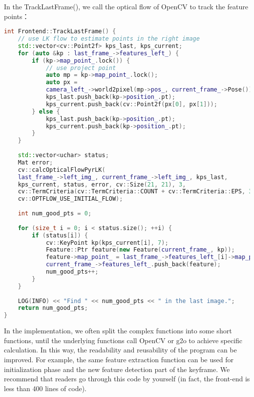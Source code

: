 In the TrackLastFrame(), we call the optical flow of OpenCV to track the feature points：
\begin{lstlisting}[language=c++,caption=slambook2/ch13/src/frontend.cpp]
int Frontend::TrackLastFrame() {
	// use LK flow to estimate points in the right image
	std::vector<cv::Point2f> kps_last, kps_current;
	for (auto &kp : last_frame_->features_left_) {
		if (kp->map_point_.lock()) {
			// use project point
			auto mp = kp->map_point_.lock();
			auto px =
			camera_left_->world2pixel(mp->pos_, current_frame_->Pose());
			kps_last.push_back(kp->position_.pt);
			kps_current.push_back(cv::Point2f(px[0], px[1]));
		} else {
			kps_last.push_back(kp->position_.pt);
			kps_current.push_back(kp->position_.pt);
		}
	}
	
	std::vector<uchar> status;
	Mat error;
	cv::calcOpticalFlowPyrLK(
	last_frame_->left_img_, current_frame_->left_img_, kps_last,
	kps_current, status, error, cv::Size(21, 21), 3,
	cv::TermCriteria(cv::TermCriteria::COUNT + cv::TermCriteria::EPS, 30, 0.01),
	cv::OPTFLOW_USE_INITIAL_FLOW);
	
	int num_good_pts = 0;
	
	for (size_t i = 0; i < status.size(); ++i) {
		if (status[i]) {
			cv::KeyPoint kp(kps_current[i], 7);
			Feature::Ptr feature(new Feature(current_frame_, kp));
			feature->map_point_ = last_frame_->features_left_[i]->map_point_;
			current_frame_->features_left_.push_back(feature);
			num_good_pts++;
		}
	}
	
	LOG(INFO) << "Find " << num_good_pts << " in the last image.";
	return num_good_pts;
}
\end{lstlisting}

In the implementation, we often split the complex functions into some short functions, until the underlying functions call OpenCV or g2o to achieve specific calculation. In this way, the readability and reusability of the program can be improved. For example, the same feature extraction function can be used for initialization phase and the new feature detection part of the keyframe. We recommend that readers go through this code by yourself (in fact, the front-end is less than 400 lines of code).

